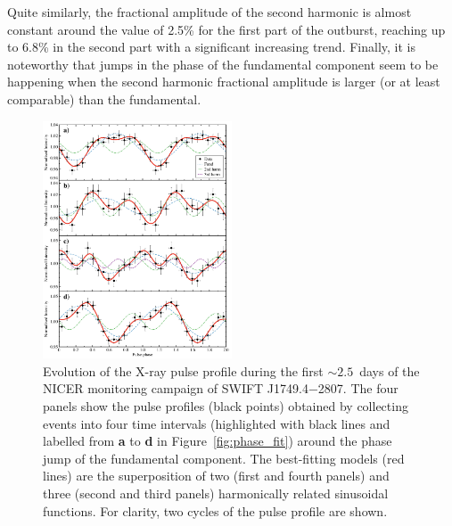 \documentclass[fleqn,usenatbib]{mnras}
\newcommand{\swiftj}{SWIFT J1749.4$-$2807}
\newcommand{\nicer}{NICER}
\begin{document}
Quite similarly, the fractional amplitude of the second harmonic is almost constant around the value of 2.5\% for the first part of the outburst, reaching up to 6.8\% in the second part with a significant increasing trend. Finally, it is noteworthy that jumps in the phase of the fundamental component seem to be happening when the second harmonic fractional amplitude is larger (or at least comparable) than the fundamental.   


\begin{figure}
\centering
\includegraphics[width=0.5\textwidth]{best_profile}
\caption{Evolution of the X-ray pulse profile during the first $\sim 2.5$~days of the \nicer{} monitoring campaign of \swiftj{}. The four panels show the pulse profiles (black points) obtained by collecting events into four time intervals (highlighted with black lines and labelled from \textbf{a} to \textbf{d} in Figure~\ref{fig:phase_fit}) around the phase jump of the fundamental component. The best-fitting models (red lines) are the superposition of two (first and fourth panels) and three (second and third panels) harmonically related sinusoidal functions. For clarity, two cycles of the pulse profile are shown.}
\label{fig:profile_evo}
\end{figure} 
\end{document}
